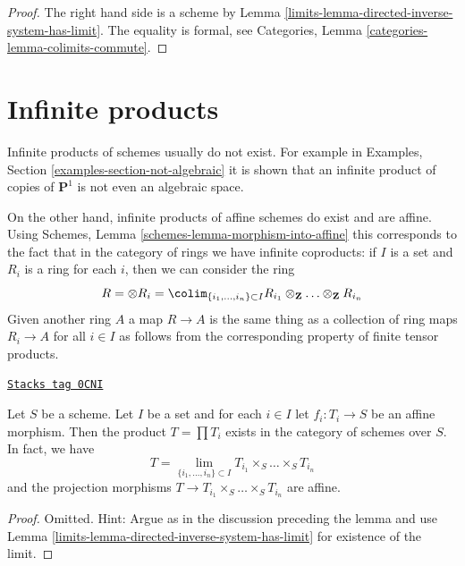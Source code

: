 \begin{proof}

The right hand side is a scheme by
Lemma \ref{limits-lemma-directed-inverse-system-has-limit}.
The equality is formal, see
Categories, Lemma \ref{categories-lemma-colimits-commute}.
\end{proof}

\section{Infinite products}
\label{limits-section-inifinite-products}
Infinite products of schemes usually do not exist. For example in
Examples, Section \ref{examples-section-not-algebraic}
it is shown that an infinite product of
copies of $\mathbf{P}^1$ is not even an algebraic space.

\medskip\noindent
On the other hand, infinite products of affine schemes do exist
and are affine. Using Schemes, Lemma \ref{schemes-lemma-morphism-into-affine}
this corresponds to the fact that in the category of rings
we have infinite coproducts: if $I$ is a set and $R_i$ is a ring
for each $i$, then we can consider the ring
$$
R = \otimes R_i =
\colim_{\{i_1, \ldots, i_n\} \subset I}
R_{i_1} \otimes_\mathbf{Z} \ldots \otimes_\mathbf{Z} R_{i_n}
$$
Given another ring $A$ a map $R \to A$ is the same thing as a
collection of ring maps $R_i \to A$ for all $i \in I$ as
follows from the corresponding property of finite tensor products.

\begin{lemma}
\label{limits-lemma-infinite-product}
\href{https://stacks.math.columbia.edu/tag/0CNI}{\texttt{Stacks tag 0CNI}}


Let $S$ be a scheme. Let $I$ be a set and for each $i \in I$
let $f_i : T_i \to S$ be an affine morphism. Then the
product $T = \prod T_i$ exists in the category of schemes
over $S$. In fact, we have
$$
T = \lim_{\{i_1, \ldots, i_n\} \subset I}
T_{i_1} \times_S \ldots \times_S T_{i_n}
$$
and the projection morphisms $T \to T_{i_1} \times_S \ldots \times_S T_{i_n}$
are affine.
\end{lemma}

\begin{proof}

Omitted. Hint: Argue as in the discussion preceding the lemma
and use Lemma \ref{limits-lemma-directed-inverse-system-has-limit}
for existence of the limit.
\end{proof}


